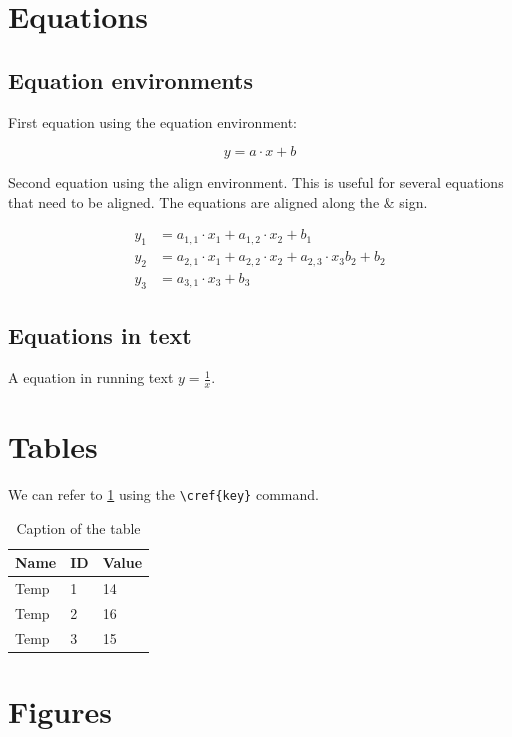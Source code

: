 \documentclass{article}
\numberwithin{equation}{section}
\begin{document}
\section{Equations}

\subsection{Equation environments}
First equation using the equation environment:

\begin{equation}
y = a \cdot x + b
\end{equation}

Second equation using the align environment. This is useful for several equations that need to be aligned. The equations are aligned along the \& sign.

\begin{align}
y_1 &= a_{1,1} \cdot x_1 + a_{1,2} \cdot x_2 + b_1 \\
y_2 &= a_{2,1} \cdot x_1 + a_{2,2} \cdot x_2 + a_{2,3} \cdot x_3 b_2 + b_2 \\
y_3 &= a_{3,1} \cdot x_3 + b_3
\end{align}

\subsection{Equations in text}

A equation in running text $y = \frac{1}{x}$.

\section{Tables}

We can refer to \cref{tab:my_label} using the \texttt{\textbackslash{}cref\{key\}} command.

\begin{table}[b]
    \centering
    \caption[First table]{Caption of the table}
    \label{tab:my_label}
    \begin{tabular}{lll}\hline
        Name & ID & Value\\\hline
         Temp & 1  & 14  \\
         Temp & 2  & 16 \\
         Temp & 3 & 15 \\ \hline
    \end{tabular}
\end{table}

\section{Figures}
\end{document}
